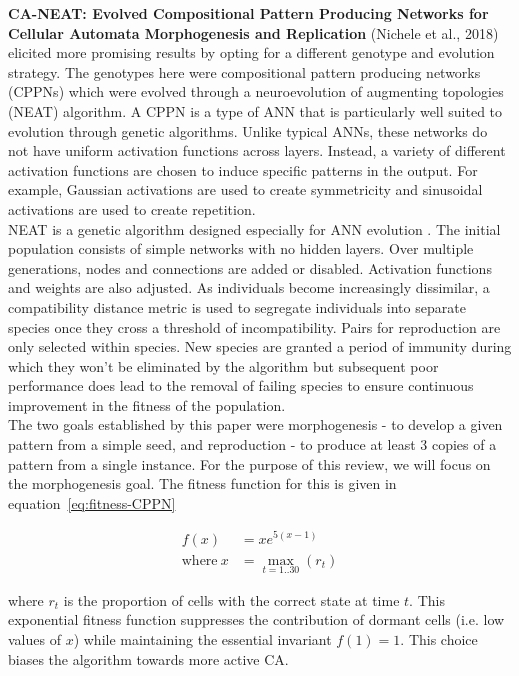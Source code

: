 \raggedbottom
\pagebreak

\noindent
\textbf{CA-NEAT: Evolved Compositional Pattern Producing Networks for Cellular Automata Morphogenesis and Replication} (Nichele et al., 2018) \cite{nichele2017neat} elicited more promising results by opting for a different genotype and evolution strategy.
The genotypes here were compositional pattern producing networks (CPPNs) which were evolved through a neuroevolution of augmenting topologies (NEAT) algorithm.
A CPPN is a type of ANN that is particularly well suited to evolution through genetic algorithms.
Unlike typical ANNs, these networks do not have uniform activation functions across layers.
Instead, a variety of different activation functions are chosen to induce specific patterns in the output.
For example, Gaussian activations are used to create symmetricity and sinusoidal activations are used to create repetition.\\

NEAT is a genetic algorithm designed especially for ANN evolution \cite{stanley2002evolving}.
The initial population consists of simple networks with no hidden layers.
Over multiple generations, nodes and connections are added or disabled.
Activation functions and weights are also adjusted.
As individuals become increasingly dissimilar, a compatibility distance metric is used to segregate individuals into separate species once they cross a threshold of incompatibility.
Pairs for reproduction are only selected within species.
New species are granted a period of immunity during which they won't be eliminated by the algorithm but subsequent poor performance does lead to the removal of failing species to ensure continuous improvement in the fitness of the population.\\

The two goals established by this paper were morphogenesis - to develop a given pattern from a simple seed, and reproduction - to produce at least 3 copies of a pattern from a single instance.
For the purpose of this review, we will focus on the morphogenesis goal.
The fitness function for this is given in equation~\ref{eq:fitness-CPPN}

\begin{align}
\label{eq:fitness-CPPN}
f(x) &= xe^{5(x-1)} \\
\text{where}~x &= \max_{t = 1 .. 30} (r_t)
\end{align}

\noindent
where $r_t$ is the proportion of cells with the correct state at time $t$.
This exponential fitness function suppresses the contribution of dormant cells (i.e. low values of $x$) while maintaining the essential invariant $f(1) = 1$.
This choice biases the algorithm towards more active CA.\\


